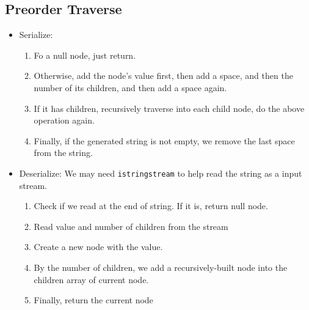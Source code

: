 \subsection{Preorder Traverse}
\begin{itemize}
\item Serialize: 
\begin{enumerate}
\item Fo a null node, just return.
\item Otherwise, add the node's value first, then add a space, and then the number of its children, and then add a space again.
\item If it has children, recursively traverse into each child node, do the above operation again.
\item Finally, if the generated string is not empty, we remove the last space from the string.
\end{enumerate}
\item Deserialize: We may need \texttt{istringstream} to help read the string as a input stream.
\begin{enumerate}
\item Check if we read at the end of string. If it is, return null node.
\item Read value and number of children from the stream
\item Create a new node with the value.
\item By the number of children, we add a recursively-built node into the children array of current node.
\item Finally, return the current node
\end{enumerate}
\end{itemize}

